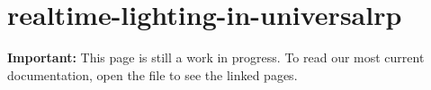 \chapter{realtime-\/lighting-\/in-\/universalrp}
\hypertarget{md__hey_tea_9_2_library_2_package_cache_2com_8unity_8render-pipelines_8universal_0d14_80_88_2_dofdb7576e5410329d9fa5085abaa69573}{}\label{md__hey_tea_9_2_library_2_package_cache_2com_8unity_8render-pipelines_8universal_0d14_80_88_2_dofdb7576e5410329d9fa5085abaa69573}
{\bfseries{Important\+:}} This page is still a work in progress. To read our most current documentation, open the  file to see the linked pages. 